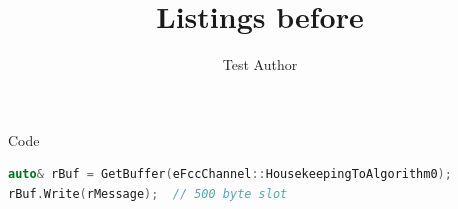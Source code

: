\documentclass[aspectratio=169,10pt]{beamer}
\title{Listings before}
\author{Test Author}
\begin{document}
\begin{frame}[fragile]{Code}
	\begin{lstlisting}[style=betterlisting, language=C++]
auto& rBuf = GetBuffer(eFccChannel::HousekeepingToAlgorithm0);
rBuf.Write(rMessage);  // 500 byte slot
	\end{lstlisting}
\end{frame}
\end{document}
